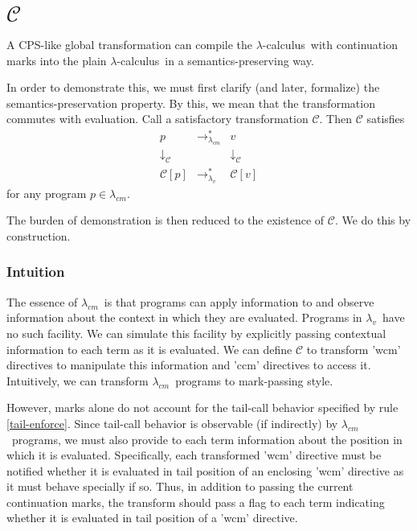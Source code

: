 \documentclass[ms,electronic,twosidetoc,letterpaper,chaptercenter,parttop]{byumsphd}
\newcommand{\lc}{$\lambda$-calculus}
\newcommand{\lv}{$\lambda_v$}
\newcommand{\cm}{$\lambda_{cm}$}
\newcommand{\lvrrs}{\rightarrow_{\lambda_v}^{*}}
\newcommand{\cmrrs}{\rightarrow_{\lambda_{cm}}^{*}}
\newcommand{\C}[1]{\mathcal{C}[#1]}
\begin{document}
\chapter{$\mathcal{C}$}

A CPS-like global transformation can compile the \lc\ with continuation marks into
the plain \lc\ in a semantics-preserving way.

In order to demonstrate this, we must first clarify (and later, formalize) the
semantics-preservation property. By this, we mean that the transformation commutes with
evaluation. Call a satisfactory transformation $\mathcal{C}$. Then $\mathcal{C}$ satisfies 
\[
\begin{array}{ccc}
p & \cmrrs & v\\
\downarrow_\mathcal{C} & & \downarrow_\mathcal{C}\\
\C{p} & \lvrrs & \C{v}
\end{array}
\]
for any program $p\in\lambda_{cm}$.

The burden of demonstration is then reduced to the existence of $\mathcal{C}$. We do this by construction.

\subsection{Intuition}

The essence of \cm\ is that programs can apply information to and observe information about the context in which they are evaluated. Programs in \lv\ have no such facility. We can simulate this facility by explicitly passing contextual information to each term as it is evaluated. We can define $\mathcal{C}$ to transform \scheme'wcm' directives to manipulate this information and \scheme'ccm' directives to access it. Intuitively, we can transform \cm\ programs to mark-passing style.

However, marks alone do not account for the tail-call behavior specified by rule \ref{tail-enforce}. Since tail-call behavior is observable (if indirectly) by \cm\ programs, we must also provide to each term information about the position in which it is evaluated. Specifically, each transformed \scheme'wcm' directive must be notified whether it is evaluated in tail position of an enclosing \scheme'wcm' directive as it must behave specially if so. Thus, in addition to passing the current continuation marks, the transform should pass a flag to each term indicating whether it is evaluated in tail position of a \scheme'wcm' directive.

\end{document}

